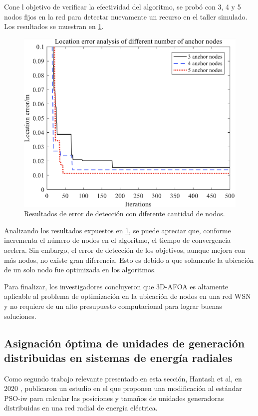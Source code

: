 \documentclass[letterpaper]{report}
\begin{document}
    Cone l objetivo de verificar la efectividad del algoritmo, se probó con 3, 4
    y 5 nodos fijos en la red para detectar nuevamente un recurso en el taller
    simulado. Los resultados se muestran en \ref{fig:location-error-3d-afoa_2}.

    \begin{figure}[ht!]
      \includegraphics[width=\textwidth]{location-error-3d-afoa_2.png}
      \centering
      \caption{Resultados de error de detección con diferente cantidad de
        nodos.}
      \label{fig:location-error-3d-afoa_2}
      \centering
    \end{figure}

    Analizando los resultados expuestos en \ref{fig:location-error-3d-afoa_2},
    se puede apreciar que, conforme incrementa el número de nodos en el
    algoritmo, el tiempo de convergencia acelera. Sin embargo, el
    error de detección de los objetivos, aunque mejora con más nodos, no existe
    gran diferencia. Esto es debido a que solamente la ubicación de un solo nodo
    fue optimizada en los algoritmos. 

    Para finalizar, los investigadores concluyeron que 3D-AFOA es altamente
    aplicable al problema de optimización en la ubicación de nodos en una red
    WSN y no requiere de un alto presupuesto computacional para lograr buenas
    soluciones. 

  \subsection{Asignación óptima de unidades de generación distribuidas en
    sistemas de energía radiales}
    Como segundo trabajo relevante presentado en esta sección, Hantash et al,
    en 2020 \cite{PSOEnergy}, publicaron un estudio en el que
    proponen una modificación al estándar PSO-iw para calcular las posiciones y
    tamaños de unidades generadoras distribuidas en una red radial de energía
    eléctrica. 
\end{document}
